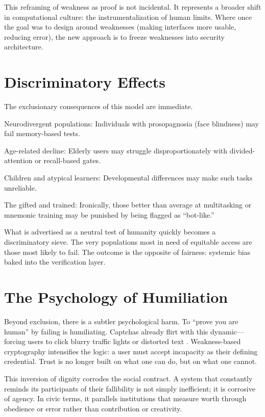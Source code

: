 \documentclass{book}
\begin{document}
This reframing of weakness as proof is not incidental. It represents a broader shift in computational culture: the instrumentalization of human limits. Where once the goal was to design around weaknesses (making interfaces more usable, reducing error), the new approach is to freeze weaknesses into security architecture.

\section{Discriminatory Effects}

The exclusionary consequences of this model are immediate.

Neurodivergent populations: Individuals with prosopagnosia (face blindness) may fail memory-based tests.

Age-related decline: Elderly users may struggle disproportionately with divided-attention or recall-based gates.

Children and atypical learners: Developmental differences may make such tasks unreliable.

The gifted and trained: Ironically, those better than average at multitasking or mnemonic training may be punished by being flagged as ``bot-like.''

What is advertised as a neutral test of humanity quickly becomes a discriminatory sieve. The very populations most in need of equitable access are those most likely to fail. The outcome is the opposite of fairness: systemic bias baked into the verification layer.

\section{The Psychology of Humiliation}

Beyond exclusion, there is a subtler psychological harm. To ``prove you are human'' by failing is humiliating. Captchas already flirt with this dynamic—forcing users to click blurry traffic lights or distorted text \cite{vonahn2003}. Weakness-based cryptography intensifies the logic: a user must accept incapacity as their defining credential. Trust is no longer built on what one can do, but on what one cannot.

This inversion of dignity corrodes the social contract. A system that constantly reminds its participants of their fallibility is not simply inefficient; it is corrosive of agency. In civic terms, it parallels institutions that measure worth through obedience or error rather than contribution or creativity.
\end{document}
